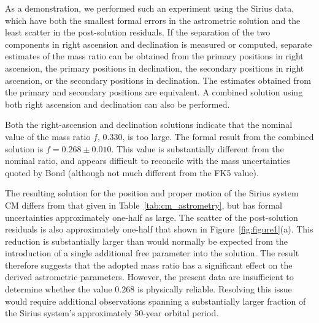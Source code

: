 \documentclass[linenumbers,trackchanges]{aastex701}
\begin{document}

As a demonstration, we performed such an experiment using the Sirius data, which have both the smallest formal errors in
the astrometric solution and the least scatter in the post-solution residuals. If the separation of the two components
in right ascension and declination is measured or computed, separate estimates of the mass ratio can be obtained from
the primary positions in right ascension, the primary positions in declination, the secondary positions in right
ascension, or the secondary positions in declination. The estimates obtained from the primary and secondary positions
are equivalent. A combined solution using both right ascension and declination can also be performed. 

 Both the right-ascension and declination solutions indicate that the nominal value of the mass ratio $f$, 0.330, is too
large. The formal result from the combined solution is $f = 0.268 \pm 0.010$.  This value is substantially different from
the nominal ratio, and appears difficult to reconcile with the mass uncertainties quoted by Bond (although not much
different from the FK5 value). 

The resulting solution for the position and proper motion of the Sirius system CM differs from that given in
Table~\ref{tab:cm_astrometry}, but has formal uncertainties approximately one-half as large. The scatter of the
post-solution residuals is also approximately one-half that shown in Figure~\ref{fig:figure1}(a). This reduction is
substantially larger than would normally be expected from the introduction of a single additional free parameter into
the solution. The result therefore suggests that the adopted mass ratio has a significant effect on the derived
astrometric parameters. However, the present data are insufficient to determine whether the value 0.268 is physically
reliable. Resolving this issue would require additional observations spanning a substantially larger fraction of the
Sirius system's approximately 50-year orbital period.
\end{document}

